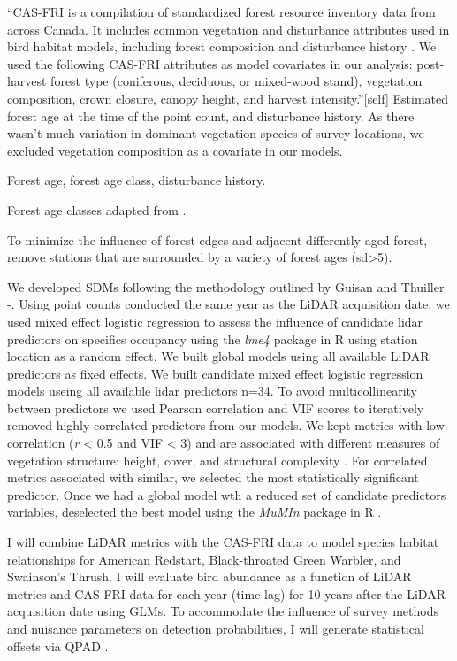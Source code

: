 \documentclass[remotesensing, aricle,submit,moreauthors]{Definitions/mdpi}
\begin{document}
``CAS-FRI is a compilation of standardized forest resource inventory data from across Canada. It includes common vegetation and disturbance attributes used in bird habitat models, including forest composition and disturbance history \citep{Cumming2011a}. We used the following CAS-FRI attributes as model covariates in our analysis: post-harvest forest type (coniferous, deciduous, or mixed-wood stand), vegetation composition, crown closure, canopy height, and harvest intensity.''{[}self{]} Estimated forest age at the time of the point count, and disturbance history. As there wasn't much variation in dominant vegetation species of survey locations, we excluded vegetation composition as a covariate in our models.

Forest age, forest age class, disturbance history.

Forest age classes adapted from \citet{chen2002dynamics}.

To minimize the influence of forest edges and adjacent differently aged forest, remove stations that are surrounded by a variety of forest ages (sd\textgreater5).

We developed SDMs following the methodology outlined by Guisan and Thuiller -\citet{Guisan2005}. Using point counts conducted the same year as the LiDAR acquisition date, we used mixed effect logistic regression to assess the influence of candidate lidar predictors on specifics occupancy using the \emph{lme4} package in R\citep{batesFittingLinearMixedeffects2015} using station location as a random effect. We built global models using all available LiDAR predictors as fixed effects. We built candidate mixed effect logistic regression models useing all available lidar predictors n=34. To avoid multicollinearity between predictors we used Pearson correlation and VIF scores to iteratively removed highly correlated predictors from our models. We kept metrics with low correlation (\emph{r} \textless{} 0.5 and VIF \textless{} 3) and are associated with different measures of vegetation structure: height, cover, and structural complexity \citep{valbuenaStandardizingEcosystemMorphological2020}. For correlated metrics associated with similar, we selected the most statistically significant predictor.
Once we had a global model wth a reduced set of candidate predictors variables, deselected the best model using the \emph{MuMIn} package in R \citet{bartonMuMInMultimodelInference2020}.

I will combine LiDAR metrics with the CAS-FRI data to model species habitat relationships for American Redstart, Black-throated Green Warbler, and Swainson's Thrush. I will evaluate bird abundance as a function of LiDAR metrics and CAS-FRI data \citep{MacKenzie2006} for each year (time lag) for 10 years after the LiDAR acquisition date using GLMs. To accommodate the influence of survey methods and nuisance parameters on detection probabilities, I will generate statistical offsets via QPAD \citep{SolymosMatsuoka2013}.
\end{document}
